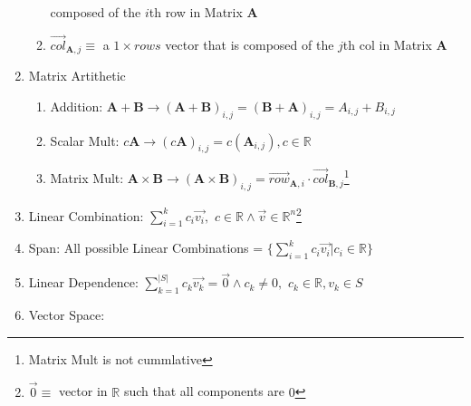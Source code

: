 \documentclass[12pt]{article}
\newcommand{\abs}[1]{\left| #1 \right|} %
\renewcommand{\=}[1]{\stackrel{#1}{=}} %
\theoremstyle{definition}
\theoremstyle{remark}
\begin{document}
\begin{enumerate}
\begin{enumerate}
    composed of the $i$th row in Matrix $\mathbf{A}$
  \item $\vec{col}_{\mathbf{A},j} \equiv$ a $1 \times rows$ vector that is
    composed of the $j$th col in Matrix $\mathbf{A}$
  \end{enumerate}
\item Matrix Artithetic
  \begin{enumerate}
  \item Addition: 
    $\mathbf{A} + \mathbf{B} \rightarrow (\mathbf{A}+\mathbf{B})_{i,j} =  (\mathbf{B} + \mathbf{A})_{i,j} =A_{i,j} + B_{i,j}$
  \item Scalar Mult: $c\mathbf{A} \rightarrow (c\mathbf{A})_{i,j} =
    c(\mathbf{A}_{i,j}), c\in \mathbb{R}$
  \item Matrix Mult: $\mathbf{A} \times \mathbf{B} \rightarrow
    (\mathbf{A} \times \mathbf{B})_{i,j} =
    \vec{row}_{\mathbf{A},i}\cdot
    \vec{col}_{\mathbf{B},j}$\footnote{Matrix Mult is not cummlative}
  \end{enumerate}
\item Linear Combination: $\sum_{i=1}^kc_i\vec{v_i},$ $c\in\mathbb{R}
  \wedge \vec{v}\in \mathbb{R}^n$\footnote{$\vec{0} \equiv$ vector in
    $\mathbb{R}$ such that all components are $0$}
\item Span: All possible Linear Combinations =
  $\{\sum_{i=1}^kc_i\vec{v_i} | c_i \in \mathbb{R} \}$
\item Linear Dependence: $\sum_{k=1}^{\abs{S}}c_k\vec{v_k}=\vec{0} \wedge
  c_k \neq 0,$  $c_k \in \mathbb{R}, v_k \in S$
\item Vector Space: 
\end{enumerate}
\end{document}
